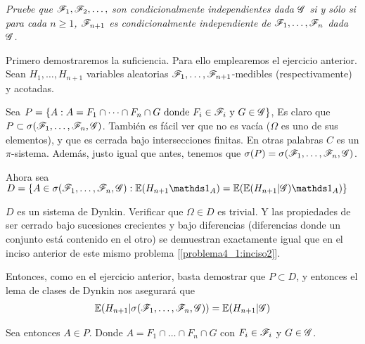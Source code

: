 \emph{
	Pruebe que $\mathscr{F}_1,\mathscr{F}_2,\ldots, $ son condicionalmente independientes dada 
	$\mathscr{G}$ si y s\'olo si para cada $n\geq 1$, $\mathscr{F}_{n+1}$ es condicionalmente 
	independiente de $\mathscr{F}_1,\ldots, \mathscr{F}_n$ dada $\mathscr{G}$. 
}

\afterstatement\pn

Primero demostraremos la suficiencia. Para ello emplearemos el ejercicio anterior.
Sean $H_1, \dots, H_{n+1}$ variables aleatorias $\mathscr{F}_1, \dots, \mathscr{F}_{n+1}$-medibles (respectivamente) 
y acotadas.\pn

Sea $P = \{ A : A = F_1 \cap \dots \cap F_n \cap G \text{ donde } F_i \in \mathscr{F}_i \text{ y } G \in \mathscr{G} \}$,
Es claro que $P \subset \sigma(\mathscr{F}_1, \dots, \mathscr{F}_n, \mathscr{G})$. También es fácil ver que no es vacía ($\Omega$ es uno de sus elementos), 
y que es cerrada bajo intersecciones finitas. En otras palabras $C$ es un $\pi$-sistema. Además, justo
igual que antes, tenemos que $\sigma(P) = \sigma(\mathscr{F}_1, \dots, \mathscr{F}_n, \mathscr{G})$.\pn

Ahora sea $D = \{ A \in \sigma(\F_1, \dots, \F_n, \G) : \E(H_{n+1} \indic_A) = \E(\E(H_{n+1} | \G) \indic_A) \}$

$D$ es un sistema de Dynkin. Verificar que $\Omega \in D$ es trivial. Y las propiedades de ser cerrado bajo sucesiones crecientes y 
bajo diferencias (diferencias donde un conjunto está contenido en el otro) se demuestran exactamente igual que en el inciso
anterior de este mismo problema [\ref{problema4_1:inciso2}].\pn

Entonces, como en el ejercicio anterior, basta demostrar que $P \subset D$, y entonces el lema de clases
de Dynkin nos asegurará que 
\begin{align}
 \mathbb{E}(H_{n+1} | \sigma(\mathscr{F}_1, \dots, \mathscr{F}_n, \mathscr{G})) = \mathbb{E}(H_{n+1} | \mathscr{G})   \label{problema4_1:hipotesis_suficiencia_4_1_3}
\end{align}\pn

Sea entonces $A \in P$. Donde $A = F_1 \cap \dots \cap F_n \cap G$ con $F_i \in \mathscr{F}_i$ y $G \in \mathscr{G}$.

